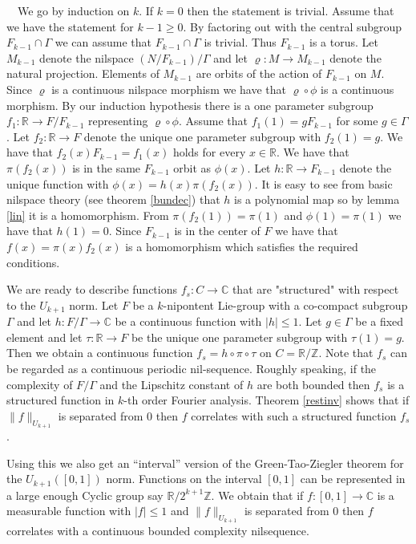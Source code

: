 \documentclass [11pt] {article}
\begin{document}
\medskip

~~We go by induction on $k$. If $k=0$ then the statement is trivial.
Assume that we have the statement for $k-1\geq 0$. By factoring out with the central subgroup $F_{k-1}\cap\Gamma$ we can assume that $F_{k-1}\cap\Gamma$ is trivial. Thus $F_{k-1}$ is a torus. Let $M_{k-1}$ denote the nilspace $(N/F_{k-1})/\Gamma$ and let $\varrho:M\rightarrow M_{k-1}$ denote the natural projection. Elements of $M_{k-1}$ are orbits of the action of $F_{k-1}$ on $M$. Since $\varrho$ is a continuous nilspace morphism we have that $\varrho\circ\phi$ is a continuous morphism. By our induction hypothesis there is a one parameter subgroup $f_1:\mathbb{R}\rightarrow F/F_{k-1}$ representing $\varrho\circ\phi$. Assume that $f_1(1)=gF_{k-1}$ for some $g\in\Gamma$. Let $f_2:\mathbb{R}\rightarrow F$ denote the unique one parameter subgroup with $f_2(1)=g$. We have that $f_2(x)F_{k-1}=f_1(x)$ holds for every $x\in\mathbb{R}$. We have that $\pi(f_2(x))$ is in the same $F_{k-1}$ orbit as $\phi(x)$. Let $h:\mathbb{R}\rightarrow F_{k-1}$ denote the unique function with $\phi(x)=h(x)\pi(f_2(x))$. It is easy to see from basic nilspace theory (see theorem \ref{bundec}) that $h$ is a polynomial map so by lemma \ref{lin} it is a homomorphism. From $\pi(f_2(1))=\pi(1)$ and $\phi(1)=\pi(1)$ we have that $h(1)=0$. Since $F_{k-1}$ is in the center of $F$ we have that $f(x)=\pi(x)f_2(x)$ is a homomorphism which satisfies the required conditions.

\medskip 
 
We are ready to describe functions $f_s:C\rightarrow\mathbb{C}$ that are "structured" with respect to the $U_{k+1}$ norm.
Let $F$ be a $k$-nipontent Lie-group with a co-compact subgroup $\Gamma$ and let $h:F/\Gamma\rightarrow\mathbb{C}$ be a continuous function with $|h|\leq 1$. Let $g\in\Gamma$ be a fixed element and let $\tau:\mathbb{R}\rightarrow F$ be the unique one parameter subgroup with $\tau(1)=g$. Then we obtain a continuous function $f_s=h\circ\pi\circ\tau$ on $C=\mathbb{R}/\mathbb{Z}$. 
Note that $f_s$ can be regarded as a continuous periodic nil-sequence. 
Roughly speaking, if the complexity of $F/\Gamma$ and the Lipschitz constant of $h$ are both bounded then $f_s$ is a structured function in $k$-th order Fourier analysis. Theorem \ref{restinv} shows that if $\|f\|_{U_{k+1}}$ is separated from $0$ then $f$ correlates with such a structured function $f_s$. 

Using this we also get an ``interval'' version of the Green-Tao-Ziegler theorem for the $U_{k+1}([0,1])$ norm.
Functions on the interval $[0,1]$ can be represented in a large enough Cyclic group say $\mathbb{R}/2^{k+1}\mathbb{Z}$.
We obtain that if $f:[0,1]\rightarrow\mathbb{C}$ is a measurable function with $|f|\leq 1$ and $\|f\|_{U_{k+1}}$ is separated from $0$ then $f$ correlates with a continuous bounded complexity nilsequence.
\end{document}
